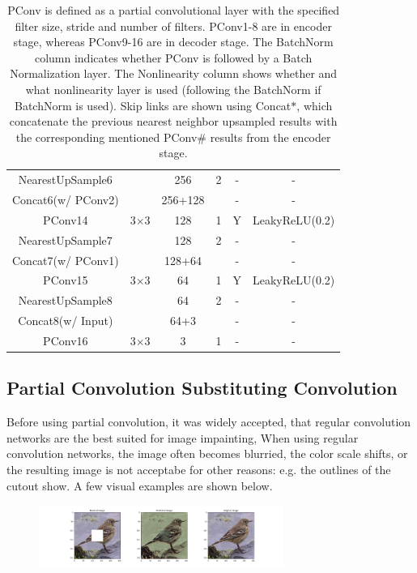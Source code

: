 \documentclass[conference]{IEEEtran}
\begin{document}
\begin{table}[H]
{\begin{tabular}{c|c|c|c|c|c}
         \hline
         NearestUpSample6& & 256& 2 & - & -\\
         Concat6(w/ PConv2)& &256+128&  & - & -\\
         PConv14&3$\times$3& 128 &1& Y& LeakyReLU(0.2)\\
         \hline
         NearestUpSample7& & 128& 2 & - & -\\
         Concat7(w/ PConv1)& &128+64&  & - & -\\
         PConv15&3$\times$3& 64 &1& Y& LeakyReLU(0.2)\\
         \hline
         NearestUpSample8& & 64& 2 & - & -\\
         Concat8(w/ Input)& &64+3&  & - & -\\
         PConv16&3$\times$3& 3 &1& - & -\\         
    \end{tabular}
    }
    \caption{PConv is defined as a partial convolutional layer with the specified filter size, stride and number of filters. PConv1-8 are in encoder stage, whereas PConv9-16 are in decoder stage. The BatchNorm column indicates whether PConv is followed by a Batch Normalization layer. The Nonlinearity column shows whether and what nonlinearity layer is used (following the BatchNorm if BatchNorm is used). Skip links are shown using Concat$*$, which concatenate the previous nearest neighbor upsampled results with the corresponding mentioned PConv\# results from the encoder stage.}
\end{table}


\subsection{Partial Convolution Substituting Convolution}
Before using partial convolution, it was widely accepted, that regular convolution networks are the best suited for image impainting, When using regular convolution networks, the image often becomes blurried, the color scale shifts, or the resulting image is not acceptabe for other reasons: e.g. the outlines of the cutout show. A few visual examples are shown below.

\begin{figure}[H]
  \centering
  \includegraphics[width=80mm, keepaspectratio]{figures/err_1.png}
\end{figure}
\end{document}
